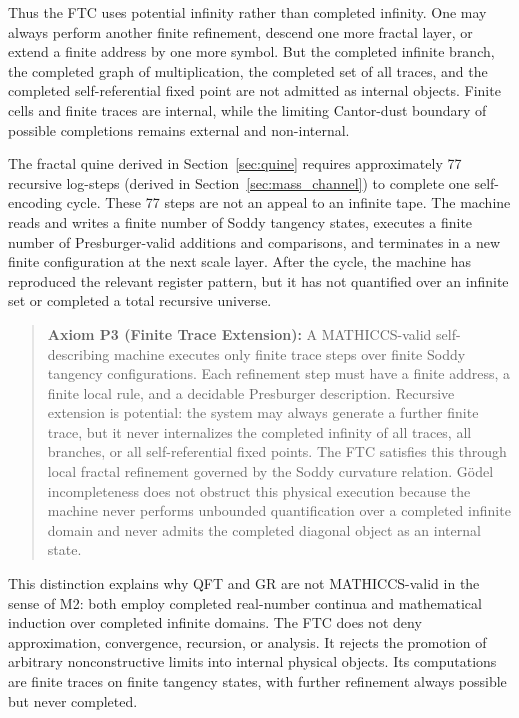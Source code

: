 \documentclass[11pt,a4paper]{article}
\begin{document}
Thus the FTC uses potential infinity rather than completed infinity. One may always perform another finite refinement, descend one more fractal layer, or extend a finite address by one more symbol. But the completed infinite branch, the completed graph of multiplication, the completed set of all traces, and the completed self-referential fixed point are not admitted as internal objects. Finite cells and finite traces are internal, while the limiting Cantor-dust boundary of possible completions remains external and non-internal.

The fractal quine derived in Section~\ref{sec:quine} requires approximately 77 recursive log-steps (derived in Section~\ref{sec:mass_channel}) to complete one self-encoding cycle. These 77 steps are not an appeal to an infinite tape. The machine reads and writes a finite number of Soddy tangency states, executes a finite number of Presburger-valid additions and comparisons, and terminates in a new finite configuration at the next scale layer. After the cycle, the machine has reproduced the relevant register pattern, but it has not quantified over an infinite set or completed a total recursive universe.

\begin{quote}
\textbf{Axiom P3 (Finite Trace Extension):} A MATHICCS-valid self-describing machine executes only finite trace steps over finite Soddy tangency configurations. Each refinement step must have a finite address, a finite local rule, and a decidable Presburger description. Recursive extension is potential: the system may always generate a further finite trace, but it never internalizes the completed infinity of all traces, all branches, or all self-referential fixed points. The FTC satisfies this through local fractal refinement governed by the Soddy curvature relation. G\"odel incompleteness does not obstruct this physical execution because the machine never performs unbounded quantification over a completed infinite domain and never admits the completed diagonal object as an internal state.
\end{quote}

This distinction explains why QFT and GR are not MATHICCS-valid in the sense of M2: both employ completed real-number continua and mathematical induction over completed infinite domains. The FTC does not deny approximation, convergence, recursion, or analysis. It rejects the promotion of arbitrary nonconstructive limits into internal physical objects. Its computations are finite traces on finite tangency states, with further refinement always possible but never completed.
\end{document}

